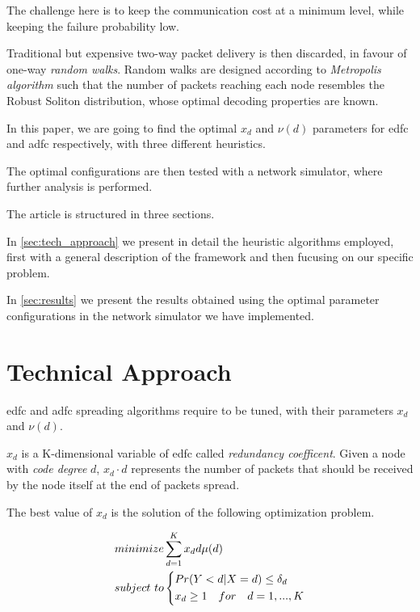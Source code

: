 \documentclass[journal]{IEEEtran}
\begin{document}
The challenge here is to keep the communication cost at a minimum level, while keeping the failure probability low.

Traditional but expensive two-way packet delivery is then discarded, in favour of one-way \emph{random walks}.
Random walks are designed according to \emph{Metropolis algorithm} such that the number of packets reaching each node resembles the Robust Soliton distribution, whose optimal decoding properties are known\cite{Luby}.

In this paper, we are going to find the optimal $x_d$ and $\nu(d)$ parameters for \gls{edfc} and \gls{adfc} respectively, with three different heuristics.

The optimal configurations are then tested with a network simulator, where further analysis is performed.

The article is structured in three sections.

In \autoref{sec:tech_approach} we present in detail the heuristic algorithms employed, first with a general description of the framework and then fucusing on our specific problem.

In \autoref{sec:results} we present the results obtained using the optimal parameter configurations in the network simulator we have implemented.

\section{Technical Approach}
\label{sec:tech_approach}

\gls{edfc} and \gls{adfc} spreading algorithms require to be tuned, with their parameters $x_d$ and $\nu(d)$.

$x_d$ is a K-dimensional variable of \gls{edfc} called \textit{redundancy coefficent}. Given a node with \textit{code degree} $d$, $x_d \cdot d$ represents the number of packets that should be received by the node itself at the end of packets spread.

The best value of $x_d$ is the solution of the following optimization problem\cite{Lin2007}.

\begin{equation}
	\label{firstproblem}
	\begin{split}
		minimize & \sum_{d=1}^K x_d d \mu (d) \\
		subject \ to & \begin{dcases}
			Pr(Y<d|X=d) \leq \delta_d \\
			x_d \geq 1 \quad for \quad d = 1,...,K
		\end{dcases}
	\end{split}
\end{equation}
\end{document}
